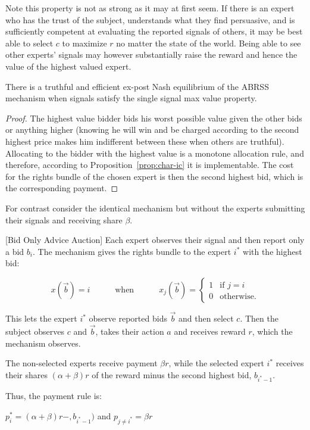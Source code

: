 Note this property is not as strong as it may at first seem. If there is an expert who has the trust of the subject, understands what they find persuasive, and is sufficiently competent at evaluating the reported signals of others, it may be best able to select $c$ to maximize $r$ no matter the state of the world. Being able to see other experts' signals may however substantially raise the reward and hence the value of the highest valued expert.  


\begin{thm}
	There is a truthful and efficient ex-post Nash equilibrium of the ABRSS mechanism when signals satisfy the single signal max value property.
\end{thm}

\begin{proof}
	The highest value bidder bids his worst possible value given the other bids or anything higher (knowing he will win and be charged according to the second highest price makes him indifferent between these when others are truthful).
	Allocating to the bidder with the highest value is a monotone allocation rule, and therefore, according to Proposition~\ref{prop:char-ic} it is implementable. The cost for the rights bundle of the chosen expert is then the second highest bid, which is the corresponding payment.
\end{proof}



For contrast consider the identical mechanism but without the experts submitting their signals and receiving share $\beta$. 
 
\begin{mech}\label{mech:BidOnly}[Bid Only Advice Auction]
 	Each expert observes their signal and then report only a bid $b_i$. The mechanism gives the rights bundle to the expert $i^*$ with the highest bid:
 	
 	$$x(\vec{b}) = i \quad \quad\quad \text{when} \quad\quad\quad x_j(\vec{b}) = \begin{cases} 1 & \text{if } j=i \\ 0 & \text{otherwise.} \end{cases}$$
 	
 	This lets the expert $i^*$ observe reported bids $\vec{b}$ and then select $c$.
 	Then the subject observes $c$ and $\vec{b}$, takes their action $a$ and receives reward $r$, which the mechanism observes. 
 	
 	The non-selected experts receive  payment $\beta r$, while the selected expert $i^*$ receives their shares $(\alpha + \beta) r$ of the reward minus the second highest bid, $b_{i^*-1}$.
 	
 	Thus, the payment rule is:
 	
 	$p_i^*= (\alpha + \beta)r - ,b_{i^*-1})$ and $p_{j\neq i^*} = \beta r$
 \end{mech}
 
